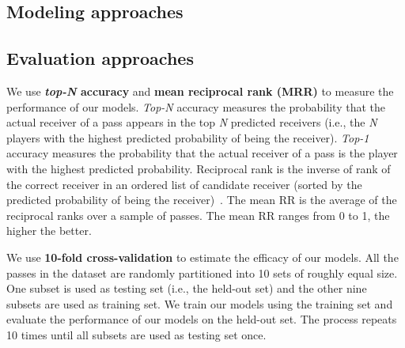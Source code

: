 \subsection{Modeling approaches}



\subsection{Evaluation approaches}

We use \textbf{\textit{top-N} accuracy} and \textbf{mean reciprocal rank (MRR)} to measure the performance of our models.
\textit{Top-N} accuracy measures the probability that the actual receiver of a pass appears in the top \textit{N} predicted receivers (i.e., the \textit{N} players with the highest predicted probability of being the receiver).
\textit{Top-1} accuracy measures the probability that the actual receiver of a pass is the player with the highest predicted probability.
Reciprocal rank is the inverse of rank of the correct receiver in an ordered list of candidate receiver (sorted by the predicted probability of being the receiver)~\cite{Craswell2009}.
The mean RR is the average of the reciprocal ranks over a sample of passes. The mean RR ranges from 0 to 1, the higher the better.
 
We use \textbf{10-fold cross-validation} to estimate the efficacy of our models. All the passes in the dataset are randomly partitioned into 10 sets of roughly equal size. One subset is used as testing set (i.e., the held-out set) and the other nine subsets are used as training set. 
We train our models using the training set and evaluate the performance of our models on the held-out set.
The process repeats 10 times until all subsets are used as testing set once.
